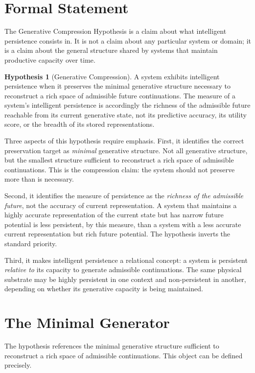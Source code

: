 \documentclass[12pt, oneside]{book}
\theoremstyle{flyxion}
\theoremstyle{definition}
\newtheorem{hypothesis}[theorem]{Hypothesis}
\begin{document}
\section{Formal Statement}

The Generative Compression Hypothesis is a claim about what
intelligent persistence consists in. It is not a claim about
any particular system or domain; it is a claim about the
general structure shared by systems that maintain productive
capacity over time.

\begin{hypothesis}[Generative Compression]
\label{hyp:gen_compression}
A system exhibits intelligent persistence when it preserves
the minimal generative structure necessary to reconstruct
a rich space of admissible future continuations. The measure
of a system's intelligent persistence is accordingly the
richness of the admissible future reachable from its current
generative state, not its predictive accuracy, its utility
score, or the breadth of its stored representations.
\end{hypothesis}

Three aspects of this hypothesis require emphasis. First,
it identifies the correct preservation target as \emph{minimal}
generative structure. Not all generative structure, but the
smallest structure sufficient to reconstruct a rich space
of admissible continuations. This is the compression claim:
the system should not preserve more than is necessary.

Second, it identifies the measure of persistence as the
\emph{richness of the admissible future}, not the accuracy
of current representation. A system that maintains a highly
accurate representation of the current state but has narrow
future potential is less persistent, by this measure, than
a system with a less accurate current representation but
rich future potential. The hypothesis inverts the standard
priority.

Third, it makes intelligent persistence a relational concept:
a system is persistent \emph{relative to} its capacity to
generate admissible continuations. The same physical substrate
may be highly persistent in one context and non-persistent
in another, depending on whether its generative capacity
is being maintained.

\section{The Minimal Generator}

The hypothesis references the minimal generative structure
sufficient to reconstruct a rich space of admissible
continuations. This object can be defined precisely.
\end{document}
